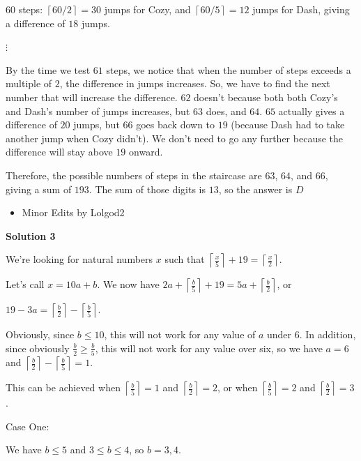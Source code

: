 \begin{enumerate}
 $60$ steps: $\left \lceil {60/2} \right \rceil = 30$ jumps for Cozy, and $\left \lceil {60/5} \right \rceil = 12$ jumps for Dash, giving a difference of $18$ jumps.

 $\vdots$

 By the time we test $61$ steps, we notice that when the number of steps exceeds a multiple of $2$, the difference in jumps increases. So, we have to find the next number that will increase the difference. $62$ doesn't because both both Cozy's and Dash's number of jumps increases, but $63$ does, and $64$. $65$ actually gives a difference of $20$ jumps, but $66$ goes back down to $19$ (because Dash had to take another jump when Cozy didn't). We don't need to go any further because the difference will stay above $19$ onward.

 Therefore, the possible numbers of steps in the staircase are $63$, $64$, and $66$, giving a sum of $193$. The sum of those digits is $13$, so the answer is $\boxed{D}$

            \begin{itemize}
        \item Minor Edits by Lolgod2
            \end{itemize}
            



\textbf{Solution 3}

We're looking for natural numbers $x$ such that $\left \lceil{\frac{x}{5}}\right \rceil + 19 = \left \lceil{\frac{x}{2}}\right \rceil$.

 Let's call $x = 10a + b$. We now have $2a  + \left \lceil{\frac{b}{5}}\right \rceil + 19 = 5a + \left  \lceil{\frac{b}{2}}\right \rceil$, or

 $19 - 3a = \left \lceil{\frac{b}{2}}\right \rceil - \left \lceil{\frac{b}{5}}\right \rceil$.

 Obviously, since $b \le 10$, this will not work for any value of $a$ under $6$. In addition, since obviously $\frac{b}{2} \ge \frac{b}{5}$, this will not work for any value over six, so we have $a = 6$ and $\left \lceil{\frac{b}{2}}\right \rceil - \left \lceil{\frac{b}{5}}\right \rceil = 1.$

 This can be achieved when $\left \lceil{\frac{b}{5}}\right \rceil = 1$ and $\left \lceil{\frac{b}{2}}\right \rceil = 2$, or when $\left \lceil{\frac{b}{5}}\right \rceil = 2$ and $\left \lceil{\frac{b}{2}}\right \rceil = 3$.

 Case One:

 We have $b \le 5$ and $3 \le b \le 4$, so $b = 3, 4$.


\end{enumerate}
